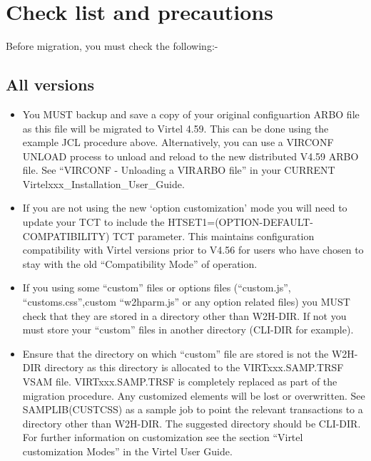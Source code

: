 \documentclass[letterpaper,10pt,english]{sphinxmanual}
\begin{document}

\newpage

\ignorespaces 

\chapter{Check list and precautions}
\label{\detokenize{Migration_Guide:check-list-and-precautions}}\label{\detokenize{Migration_Guide:index-2}}
Before migration, you must check the following:-


\section{All versions}
\label{\detokenize{Migration_Guide:all-versions}}\begin{itemize}
\item {} 
You MUST backup and save a copy of your original configuartion ARBO file as this file will be migrated to Virtel 4.59. This can be done using the example JCL procedure above. Alternatively, you can use a VIRCONF UNLOAD process to unload and reload to the new distributed V4.59 ARBO file. See “VIRCONF - Unloading a VIRARBO file” in your CURRENT Virtelxxx\_Installation\_User\_Guide.

\item {} 
If you are not using the new ‘option customization’ mode you will need to update your TCT to include the HTSET1=(OPTION-DEFAULT-COMPATIBILITY) TCT parameter. This maintains configuration compatibility with Virtel versions prior to V4.56 for users who have chosen to stay with the old “Compatibility Mode” of operation.

\item {} 
If you using some “custom” files or options files (“custom.js”, “customs.css”,custom “w2hparm.js” or any option related files) you MUST check that they are stored in a directory other than W2H-DIR. If not you must store your “custom” files in another directory (CLI-DIR for example).

\item {} 
Ensure that the directory on which “custom” file are stored is not the W2H-DIR directory as this directory is allocated to the VIRTxxx.SAMP.TRSF VSAM file. VIRTxxx.SAMP.TRSF is completely replaced as part of the migration procedure. Any customized elements will be lost or overwritten. See SAMPLIB(CUSTCSS) as a sample job to point the relevant transactions to a directory other than W2H-DIR. The suggested directory should be CLI-DIR. For further information on customization see the section “Virtel customization Modes” in the Virtel User Guide.

\end{itemize}
\end{document}
